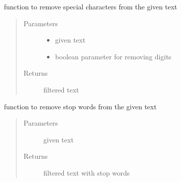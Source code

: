 \documentclass[letterpaper,10pt,english]{sphinxmanual}
\begin{document}
\begin{fulllineitems}
\label{\detokenize{index:data_preprocessing.data_preprocessing_functions.remove_special_characters}}
\sphinxAtStartPar
function to remove special characters from the given text
\begin{quote}\begin{description}
\item[{Parameters}] \leavevmode\begin{itemize}
\item {} 
\sphinxAtStartPar
{} \textendash{} given text

\item {} 
\sphinxAtStartPar
{} \textendash{} boolean parameter for removing digits

\end{itemize}

\item[{Returns}] \leavevmode
\sphinxAtStartPar
filtered text

\end{description}\end{quote}

\end{fulllineitems}


\begin{fulllineitems}
\label{\detokenize{index:data_preprocessing.data_preprocessing_functions.remove_stopwords}}
\sphinxAtStartPar
function to remove stop words from the given text
\begin{quote}\begin{description}
\item[{Parameters}] \leavevmode
\sphinxAtStartPar
{} \textendash{} given text

\item[{Returns}] \leavevmode
\sphinxAtStartPar
filtered text with stop words

\end{description}\end{quote}

\end{fulllineitems}
\end{document}
